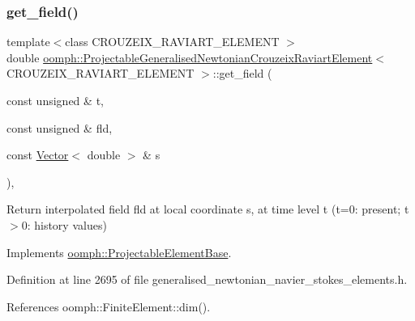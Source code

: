 \subsubsection{\texorpdfstring{get\+\_\+field()}{get\_field()}}
{\footnotesize\ttfamily template$<$class C\+R\+O\+U\+Z\+E\+I\+X\+\_\+\+R\+A\+V\+I\+A\+R\+T\+\_\+\+E\+L\+E\+M\+E\+NT $>$ \\
double \hyperlink{classoomph_1_1ProjectableGeneralisedNewtonianCrouzeixRaviartElement}{oomph\+::\+Projectable\+Generalised\+Newtonian\+Crouzeix\+Raviart\+Element}$<$ C\+R\+O\+U\+Z\+E\+I\+X\+\_\+\+R\+A\+V\+I\+A\+R\+T\+\_\+\+E\+L\+E\+M\+E\+NT $>$\+::get\+\_\+field (\begin{DoxyParamCaption}\item[{const unsigned \&}]{t,  }\item[{const unsigned \&}]{fld,  }\item[{const \hyperlink{classoomph_1_1Vector}{Vector}$<$ double $>$ \&}]{s }\end{DoxyParamCaption})\hspace{0.3cm}{\ttfamily [inline]}, {\ttfamily [virtual]}}



Return interpolated field fld at local coordinate s, at time level t (t=0\+: present; t$>$0\+: history values) 



Implements \hyperlink{classoomph_1_1ProjectableElementBase_ae4da5b565b6d333be2f5920f7be763cd}{oomph\+::\+Projectable\+Element\+Base}.



Definition at line 2695 of file generalised\+\_\+newtonian\+\_\+navier\+\_\+stokes\+\_\+elements.\+h.



References oomph\+::\+Finite\+Element\+::dim().

\mbox{\label{classoomph_1_1ProjectableGeneralisedNewtonianCrouzeixRaviartElement_ae766399afa32fb3e77fb0ce9f7cb8a1c}} 
